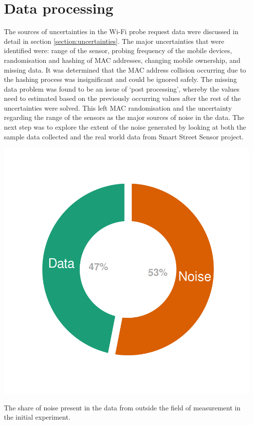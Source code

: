 \section{Data processing} \label{section:processing}

The sources of uncertainties in the Wi-Fi probe request data were discussed in detail in section \ref{section:uncertainties}.
The major uncertainties that were identified were: range of the sensor, probing frequency of the mobile devices, randomisation and hashing of MAC addresses, changing mobile ownership, and missing data.
It was determined that the MAC address collision occurring due to the hashing process was insignificant and could be ignored safely.
The missing data problem was found to be an issue of `post processing', whereby the values need to estimated based on the previously occurring values after the rest of the uncertainties were solved.
This left MAC randomisation and the uncertainty regarding the range of the sensors as the major sources of noise in the data.
The next step was to explore the extent of the noise generated by looking at both the sample data collected and the real world data from Smart Street Sensor project.

\begin{marginfigure}[-7cm]
  \includegraphics[trim={10 10 10 10},clip]{images/processing-error-signal.png}
  \caption{The share of noise present in the data from outside the field of measurement in the initial experiment.}
  \label{figure:processing:error:signal}
\end{marginfigure}

